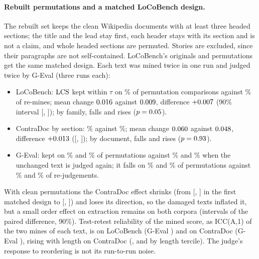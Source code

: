 \paragraph{Rebuilt permutations and a matched LoCoBench design.} The rebuilt set keeps the
\extSecClPermNGpt{} clean Wikipedia documents with at least three headed sections; the title and the
lead stay first, each header stays with its section and is not a claim, and whole headed sections
are permuted. Stories are excluded, since their paragraphs are not self-contained. LoCoBench's
originals and permutations get the same matched design. Each text was mined twice in one run and
judged twice by G-Eval (three runs each):
\begin{itemize}[leftmargin=1.2em,itemsep=1pt,topsep=2pt]
\item LoCoBench: $\mathrm{LCS}$ kept within $\tau$ on \extLmPermInvGpt\% of \extLmEqNPermGpt{} permutation
  comparisons against \extLmNoiseInvGpt\% of \extLmEqNNoiseGpt{} re-mines; mean change
  $0.016$ against $0.009$, difference $+0.007$ (90\% interval
  [\extLmEqLoGpt, \extLmEqHiGpt]); by family, \extLmClPermDecGpt{} falls and \extLmClPermIncGpt{} rises
  ($p=0.05$).
\item ContraDoc by section: \extSecPermInvGpt\% against \extSecNoiseInvGpt\%; mean change
  $0.060$ against $0.048$, difference $+0.013$
  ([\extSecEqLoGpt, \extSecEqHiGpt]); by document, \extSecClPermDecGpt{} falls and
  \extSecClPermIncGpt{} rises ($p=0.93$).
\item G-Eval: kept on \extLmJudgePermInv\% and \extSecJudgePermInv\% of permutations against
  \extLmJudgeNoiseInv\% and \extSecJudgeNoiseInv\% when the unchanged text is judged again; it falls on
  \extLmJudgePermDec\% and \extSecJudgePermDec\% of permutations against \extLmJudgeNoiseDec\% and
  \extSecJudgeNoiseDec\% of re-judgements.
\end{itemize}
With clean permutations the ContraDoc effect shrinks (from [\extMtEqLoGpt, \extMtEqHiGpt] in the first
matched design to [\extSecEqLoGpt, \extSecEqHiGpt]) and loses its direction, so the damaged texts
inflated it, but a small order effect on extraction remains on both corpora (intervals of the
paired difference, 90\%). Test-retest reliability of the mined score, as ICC(A,1) of the two mines of
each text, is \extLmIccLcsAllGpt{} on LoCoBench (G-Eval \extLmIccJudgeAll) and \extSecIccLcsAllGpt{} on
ContraDoc (G-Eval \extSecIccJudgeAll), rising with length on ContraDoc (\extSecIccLcsShortGpt,
\extSecIccLcsMidGpt{} and \extSecIccLcsLongGpt{} by length tercile). The judge's response to
reordering is not its run-to-run noise.

